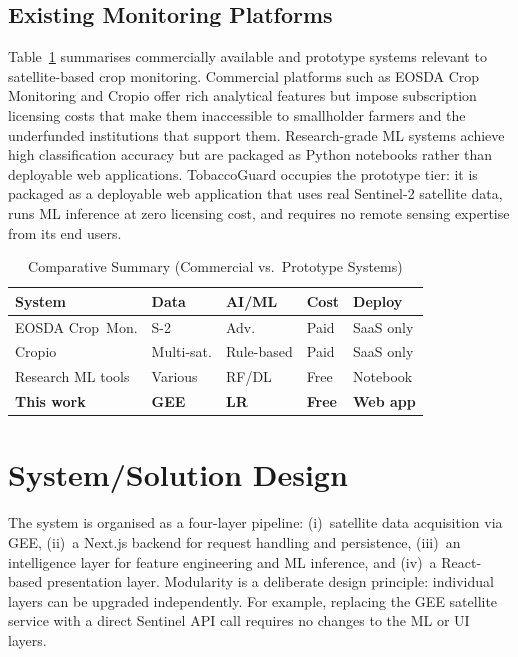 \documentclass[conference]{IEEEtran}
\begin{document}
\subsection{Existing Monitoring Platforms}

Table~\ref{tab:comparison} summarises commercially available and
prototype systems relevant to satellite-based crop monitoring.  Commercial
platforms such as EOSDA Crop Monitoring and Cropio offer rich analytical
features but impose subscription licensing costs that make them
inaccessible to smallholder farmers and the underfunded institutions that
support them. Research-grade ML systems achieve high classification
accuracy but are packaged as Python notebooks rather than deployable
web applications. TobaccoGuard occupies the prototype tier: it is
packaged as a deployable web application that uses real Sentinel-2
satellite data, runs ML inference at zero licensing cost, and requires no
remote sensing expertise from its end users.

\begin{table}[!t]
\caption{Comparative Summary (Commercial vs.\ Prototype Systems)}
\label{tab:comparison}
\centering
\footnotesize
\setlength{\tabcolsep}{2pt}
\begin{tabular}{p{1.55cm}p{1.1cm}p{0.85cm}p{0.6cm}p{1.45cm}}
\toprule
\textbf{System} & \textbf{Data} & \textbf{AI/ML} &
\textbf{Cost} & \textbf{Deploy} \\
\midrule
EOSDA Crop~Mon.   & S-2       & Adv.       & Paid  & SaaS only \\
Cropio            & Multi-sat.& Rule-based & Paid  & SaaS only \\
Research ML tools & Various   & RF/DL      & Free  & Notebook \\
\textbf{This work} & \textbf{GEE} & \textbf{LR} & \textbf{Free} & \textbf{Web app} \\
\bottomrule
\end{tabular}
\end{table}

\section{System/Solution Design}

The system is organised as a four-layer pipeline: (i)~satellite data
acquisition via GEE, (ii)~a Next.js backend for request handling and
persistence, (iii)~an intelligence layer for feature engineering and ML
inference, and (iv)~a React-based presentation layer. Modularity is
a deliberate design principle: individual layers can be upgraded
independently. For example, replacing the GEE satellite service with a
direct Sentinel API call requires no changes to the ML or UI layers.
\end{document}
